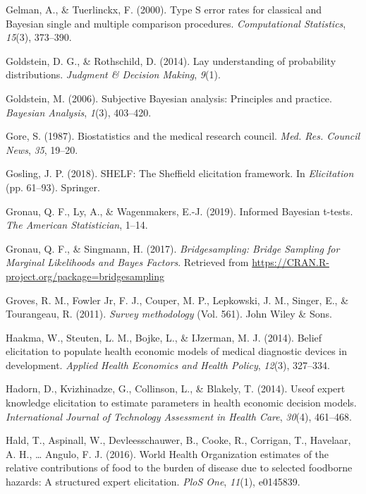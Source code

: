 \documentclass[openright,titlepage,12pt,a4paper]{book}
\begin{document}
\leavevmode\hypertarget{ref-gelman_type_2000}{}%
Gelman, A., \& Tuerlinckx, F. (2000). Type S error rates for classical and Bayesian single and multiple comparison procedures. \emph{Computational Statistics}, \emph{15}(3), 373--390.

\leavevmode\hypertarget{ref-goldstein_lay_2014}{}%
Goldstein, D. G., \& Rothschild, D. (2014). Lay understanding of probability distributions. \emph{Judgment \& Decision Making}, \emph{9}(1).

\leavevmode\hypertarget{ref-goldstein_subjective_2006}{}%
Goldstein, M. (2006). Subjective Bayesian analysis: Principles and practice. \emph{Bayesian Analysis}, \emph{1}(3), 403--420.

\leavevmode\hypertarget{ref-gore_biostatistics_1987}{}%
Gore, S. (1987). Biostatistics and the medical research council. \emph{Med. Res. Council News}, \emph{35}, 19--20.

\leavevmode\hypertarget{ref-gosling_shelf:_2018}{}%
Gosling, J. P. (2018). SHELF: The Sheffield elicitation framework. In \emph{Elicitation} (pp. 61--93). Springer.

\leavevmode\hypertarget{ref-gronau_informed_2019}{}%
Gronau, Q. F., Ly, A., \& Wagenmakers, E.-J. (2019). Informed Bayesian t-tests. \emph{The American Statistician}, 1--14.

\leavevmode\hypertarget{ref-gronau_bridgesampling:_2017}{}%
Gronau, Q. F., \& Singmann, H. (2017). \emph{Bridgesampling: Bridge Sampling for Marginal Likelihoods and Bayes Factors}. Retrieved from \url{https://CRAN.R-project.org/package=bridgesampling}

\leavevmode\hypertarget{ref-groves_survey_2011}{}%
Groves, R. M., Fowler Jr, F. J., Couper, M. P., Lepkowski, J. M., Singer, E., \& Tourangeau, R. (2011). \emph{Survey methodology} (Vol. 561). John Wiley \& Sons.

\leavevmode\hypertarget{ref-haakma_belief_2014}{}%
Haakma, W., Steuten, L. M., Bojke, L., \& IJzerman, M. J. (2014). Belief elicitation to populate health economic models of medical diagnostic devices in development. \emph{Applied Health Economics and Health Policy}, \emph{12}(3), 327--334.

\leavevmode\hypertarget{ref-hadorn_useof_2014}{}%
Hadorn, D., Kvizhinadze, G., Collinson, L., \& Blakely, T. (2014). Useof expert knowledge elicitation to estimate parameters in health economic decision models. \emph{International Journal of Technology Assessment in Health Care}, \emph{30}(4), 461--468.

\leavevmode\hypertarget{ref-hald_world_2016}{}%
Hald, T., Aspinall, W., Devleesschauwer, B., Cooke, R., Corrigan, T., Havelaar, A. H., \ldots{} Angulo, F. J. (2016). World Health Organization estimates of the relative contributions of food to the burden of disease due to selected foodborne hazards: A structured expert elicitation. \emph{PloS One}, \emph{11}(1), e0145839.
\end{document}
